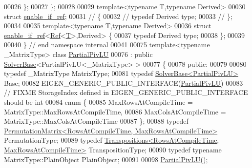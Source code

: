 \begin{DoxyCode}
00026   \};
00027 \};
00028 
00029 \textcolor{keyword}{template}<\textcolor{keyword}{typename} T,\textcolor{keyword}{typename} Derived>
\hyperlink{struct_eigen_1_1internal_1_1enable__if__ref}{00030} \textcolor{keyword}{struct }\hyperlink{struct_eigen_1_1internal_1_1enable__if__ref}{enable\_if\_ref};
00031 \textcolor{comment}{// \{}
00032 \textcolor{comment}{//   typedef Derived type;}
00033 \textcolor{comment}{// \};}
00034 
00035 \textcolor{keyword}{template}<\textcolor{keyword}{typename} T,\textcolor{keyword}{typename} Derived>
\hyperlink{struct_eigen_1_1internal_1_1enable__if__ref_3_01_ref_3_01_t_01_4_00_01_derived_01_4}{00036} \textcolor{keyword}{struct }\hyperlink{struct_eigen_1_1internal_1_1enable__if__ref}{enable\_if\_ref}<\hyperlink{group___core___module_class_eigen_1_1_ref}{Ref}<\hyperlink{group___sparse_core___module}{T}>,Derived> \{
00037   \textcolor{keyword}{typedef} Derived type;
00038 \};
00039 
00040 \} \textcolor{comment}{// end namespace internal}
00041 
00075 \textcolor{keyword}{template}<\textcolor{keyword}{typename} \_MatrixType> \textcolor{keyword}{class }\hyperlink{group___l_u___module_class_eigen_1_1_partial_piv_l_u}{PartialPivLU}
00076   : \textcolor{keyword}{public} \hyperlink{class_eigen_1_1_solver_base}{SolverBase}<PartialPivLU<\_MatrixType> >
00077 \{
00078   \textcolor{keyword}{public}:
00079 
00080     \textcolor{keyword}{typedef} \_MatrixType MatrixType;
00081     \textcolor{keyword}{typedef} \hyperlink{class_eigen_1_1_solver_base}{SolverBase<PartialPivLU>} Base;
00082     EIGEN\_GENERIC\_PUBLIC\_INTERFACE(\hyperlink{group___l_u___module_class_eigen_1_1_partial_piv_l_u}{PartialPivLU})
00083     \textcolor{comment}{// FIXME StorageIndex defined in EIGEN\_GENERIC\_PUBLIC\_INTERFACE should be int}
00084     \textcolor{keyword}{enum} \{
00085       MaxRowsAtCompileTime = MatrixType::MaxRowsAtCompileTime,
00086       MaxColsAtCompileTime = MatrixType::MaxColsAtCompileTime
00087     \};
00088     \textcolor{keyword}{typedef} \hyperlink{group___core___module}{PermutationMatrix<RowsAtCompileTime, MaxRowsAtCompileTime>}
       PermutationType;
00089     \textcolor{keyword}{typedef} \hyperlink{group___core___module}{Transpositions<RowsAtCompileTime, MaxRowsAtCompileTime>}
       TranspositionType;
00090     \textcolor{keyword}{typedef} \textcolor{keyword}{typename} MatrixType::PlainObject PlainObject;
00091 
00098     \hyperlink{group___l_u___module_class_eigen_1_1_partial_piv_l_u}{PartialPivLU}();

\end{DoxyCode}
